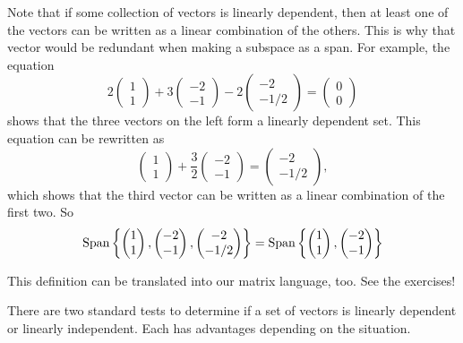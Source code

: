 \documentclass[elementsmain.tex]{subfiles}
\begin{document}
Note that if some collection of vectors is linearly dependent, then at least one of the vectors can be written as a linear combination of the others. This is why that vector would be redundant when making a subspace as a span. For example, the equation
\[
2\begin{pmatrix} 1 \\ 1 \end{pmatrix} + 3\begin{pmatrix} -2 \\ -1 \end{pmatrix} - 2
\begin{pmatrix} -2 \\ -1/2 \end{pmatrix} = \begin{pmatrix} 0 \\ 0 \end{pmatrix} 
\]
shows that the three vectors on the left form a linearly dependent set. This equation can be rewritten as
\[
\begin{pmatrix} 1 \\ 1 \end{pmatrix} + \dfrac{3}{2}\begin{pmatrix} -2 \\ -1 \end{pmatrix} = \begin{pmatrix} -2 \\ -1/2 \end{pmatrix},  
\]
which shows that the third vector can be written as a linear combination of the first two. So
\[
\mathrm{Span}\left\{ \begin{pmatrix} 1 \\ 1 \end{pmatrix}, \begin{pmatrix} -2 \\ -1 \end{pmatrix}, \begin{pmatrix} -2 \\ -1/2 \end{pmatrix} \right\}
= \mathrm{Span}\left\{  \begin{pmatrix} 1 \\ 1 \end{pmatrix}, \begin{pmatrix} -2 \\ -1 \end{pmatrix} \right\}
\]

This definition can be translated into our matrix language, too. See the exercises!

There are two standard tests to determine if a set of vectors is linearly dependent or linearly independent. Each has advantages depending on the situation.
\end{document}
